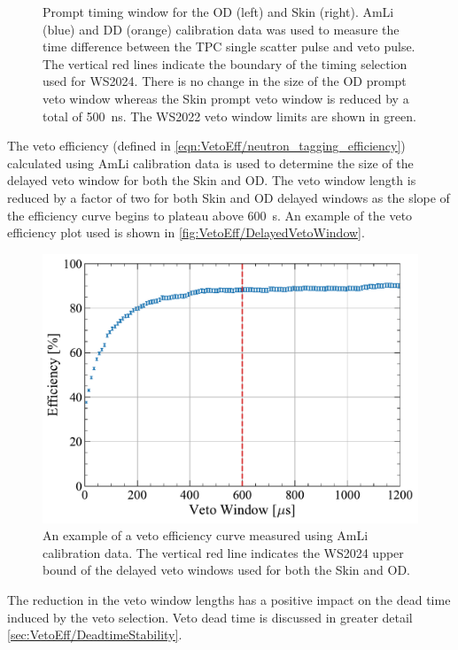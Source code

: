 \begin{figure}[!ht]
	\caption[Prompt timing window for the OD (left) and Skin (right). 
    AmLi (blue) and DD (orange) calibration data was used to measure the time difference between the TPC single scatter pulse and veto pulse.]{Prompt timing window for the OD (left) and Skin (right). 
    AmLi (blue) and DD (orange) calibration data was used to measure the time difference between the TPC single scatter pulse and veto pulse. 
    The vertical red lines indicate the boundary of the timing selection used for WS2024. There is no change in the size of the OD prompt veto window whereas the Skin prompt veto window is reduced by a total of 500~ns. The WS2022 veto window limits are shown in green.}
	\label{fig:VetoEff/veto_prompt_windows}
\end{figure}

The veto efficiency (defined in \autoref{eqn:VetoEff/neutron_tagging_efficiency}) calculated using AmLi calibration data is used to determine the size of the delayed veto window for both the Skin and OD. The veto window length is reduced by a factor of two for both Skin and OD delayed windows as the slope of the efficiency curve begins to plateau above 600~\textmu s. An example of the veto efficiency plot used is shown in \autoref{fig:VetoEff/DelayedVetoWindow}.
\begin{figure}[!ht]
    \centering
    \includegraphics[width=0.7\linewidth]{figures/VetoEfficiency/DelayedVetoWindow.pdf}
    \caption[An example of a veto efficiency curve measured using AmLi calibration data.]{An example of a veto efficiency curve measured using AmLi calibration data. The vertical red line indicates the WS2024 upper bound of the delayed veto windows used for both the Skin and OD.}
    \label{fig:VetoEff/DelayedVetoWindow}
\end{figure}

The reduction in the veto window lengths has a positive impact on the dead time induced by the veto selection. Veto dead time is discussed in greater detail \autoref{sec:VetoEff/DeadtimeStability}.

